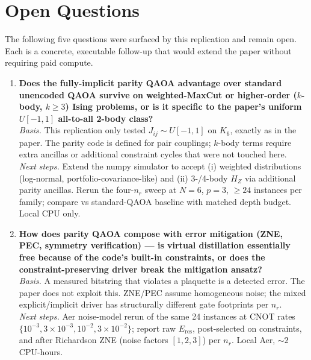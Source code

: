 \section{Open Questions}

The following five questions were surfaced by this replication and remain
open. Each is a concrete, executable follow-up that would extend the paper
without requiring paid compute.

\begin{enumerate}

\item \textbf{Does the fully-implicit parity QAOA advantage over standard
unencoded QAOA survive on weighted-MaxCut or higher-order ($k$-body,
$k\ge 3$) Ising problems, or is it specific to the paper's uniform
$U[-1,1]$ all-to-all 2-body class?}\\
\textit{Basis.} This replication only tested $J_{ij}\sim U[-1,1]$ on $K_6$,
exactly as in the paper. The parity code is defined for pair couplings;
$k$-body terms require extra ancillas or additional constraint cycles
that were not touched here.\\
\textit{Next steps.} Extend the numpy simulator to accept (i) weighted
distributions (log-normal, portfolio-covariance-like) and (ii) 3-/4-body
$H_Z$ via additional parity ancillas. Rerun the four-$n_r$ sweep at $N=6$,
$p=3$, $\ge 24$ instances per family; compare vs standard-QAOA baseline
with matched depth budget. Local CPU only.

\item \textbf{How does parity QAOA compose with error mitigation (ZNE,
PEC, symmetry verification) --- is virtual distillation essentially free
because of the code's built-in constraints, or does the constraint-preserving
driver break the mitigation ansatz?}\\
\textit{Basis.} A measured bitstring that violates a plaquette
is a detected error. The paper does not exploit this. ZNE/PEC assume
homogeneous noise; the mixed explicit/implicit driver has structurally
different gate footprints per $n_r$.\\
\textit{Next steps.} Aer noise-model rerun of the same 24 instances at
CNOT rates $\{10^{-3},3{\times}10^{-3},10^{-2},3{\times}10^{-2}\}$;
report raw $E_{\mathrm{res}}$, post-selected on constraints, and after
Richardson ZNE (noise factors $[1,2,3]$) per $n_r$. Local Aer, $\sim 2$
CPU-hours.


\end{enumerate}
